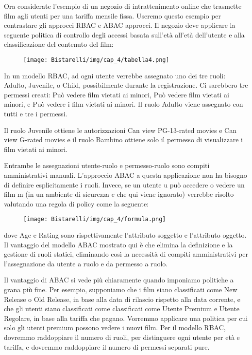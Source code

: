 Ora considerate l'esempio di un negozio di intrattenimento online che trasmette film agli utenti per una tariffa mensile fissa. Useremo questo esempio per contrastare gli approcci RBAC e ABAC approcci. Il negozio deve applicare la seguente politica di controllo degli accessi basata sull'età all'età dell'utente e alla classificazione del contenuto del film:

\begin{figure}[H]
	\centering
    \texttt{[image: Bistarelli/img/cap\_4/tabella4.png]}
\end{figure}

In un modello RBAC, ad ogni utente verrebbe assegnato uno dei tre ruoli: Adulto, Juvenile, o Child, possibilmente durante la registrazione. Ci sarebbero tre permessi creati: Può vedere film vietati ai minori, Può vedere film vietati ai minori, e Può vedere i film vietati ai minori. Il ruolo Adulto viene assegnato con tutti e tre i permessi.

Il ruolo Juvenile ottiene le autorizzazioni Can view PG-13-rated movies e Can view G-rated movies e il ruolo Bambino ottiene solo il permesso di visualizzare i film vietati ai minori.

Entrambe le assegnazioni utente-ruolo e permesso-ruolo sono compiti amministrativi manuali. L'approccio ABAC a questa applicazione non ha bisogno di definire esplicitamente i ruoli. Invece, se un utente u può accedere o vedere un film m (in un ambiente di sicurezza e che qui viene ignorato) verrebbe risolto valutando una regola di policy come la seguente:

\begin{figure}[H]
	\centering
    \texttt{[image: Bistarelli/img/cap\_4/formula.png]}
\end{figure}

dove Age e Rating sono rispettivamente l'attributo soggetto e l'attributo oggetto. Il vantaggio del modello ABAC mostrato qui è che elimina la definizione e la gestione di ruoli statici, eliminando così la necessità di compiti amministrativi per l'assegnazione da utente a ruolo e da permesso a ruolo.

Il vantaggio di ABAC si vede più chiaramente quando imponiamo politiche a grana più fine. Per esempio, supponiamo che i film siano classificati come New Release o Old Release, in base alla data di rilascio rispetto alla data corrente, e che gli utenti siano classificati come classificati come Utente Premium e Utente Regolare, in base alla tariffa che pagano. Vorremmo applicare una politica per cui solo gli utenti premium possono vedere i nuovi film. Per il modello RBAC, dovremmo raddoppiare il numero di ruoli, per distinguere ogni utente per età e tariffa, e dovremmo raddoppiare il numero di permessi separati pure.

